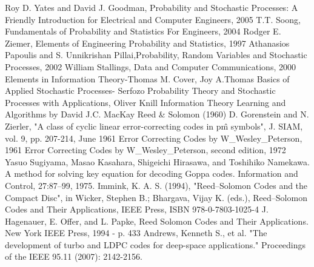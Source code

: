 \documentclass[10pt,twocolumn,letterpaper]{article}
\begin{document}
\begin{thebibliography}{}
Roy D. Yates and David J. Goodman, Probability and Stochastic Processes: A Friendly Introduction for Electrical and Computer Engineers, 2005
T.T. Soong, Fundamentals of Probability and Statistics For Engineers, 2004
Rodger E. Ziemer, Elements of Engineering Probability and Statistics, 1997
Athanasios Papoulis and S. Unnikrishan Pillai,Probability, Random Variables and Stochastic Processes, 2002
William Stallings, Data and Computer Communications, 2000
Elements in Information Theory-Thomas M. Cover, Joy A.Thomas
Basics of Applied Stochastic Processes- Serfozo
Probability Theory and Stochastic Processes with Applications, Oliver Knill
Information Theory Learning and Algorithms by David J.C. MacKay
Reed \& Solomon (1960)
D. Gorenstein and N. Zierler, "A class of cyclic linear error-correcting codes in p\^m symbols", J. SIAM, vol. 9, pp. 207-214, June 1961 Error Correcting Codes by W\_Wesley\_Peterson, 1961
Error Correcting Codes by W\_Wesley\_Peterson, second edition, 1972
Yasuo Sugiyama, Masao Kasahara, Shigeichi Hirasawa, and Toshihiko Namekawa. A method for solving key equation for decoding Goppa codes. Information and Control, 27:87–99, 1975.
Immink, K. A. S. (1994), "Reed–Solomon Codes and the Compact Disc", in Wicker, Stephen B.; Bhargava, Vijay K. (eds.), Reed–Solomon Codes and Their Applications, IEEE Press, ISBN 978-0-7803-1025-4
J. Hagenauer, E. Offer, and L. Papke, Reed Solomon Codes and Their Applications. New York IEEE Press, 1994 - p. 433 Andrews, Kenneth S., et al. "The development of turbo and LDPC codes for deep-space applications." Proceedings of the IEEE 95.11 (2007): 2142-2156.
\end{thebibliography}
\end{document}
